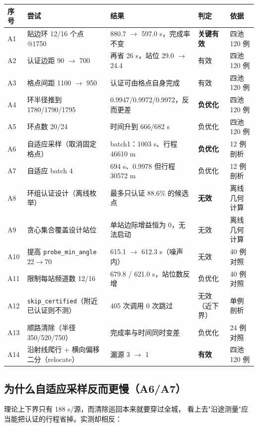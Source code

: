 \begin{center}
\footnotesize
\scriptsize
\begin{longtable}{p{0.5cm}p{3.2cm}p{3.0cm}p{2.1cm}p{2.9cm}}
\toprule
序号 & 尝试 & 结果 & 判定 & 依据 \\ \midrule
\endhead
A1 & 贴边环 12/16 个点 @1750 & 880.7 $\to$ 597.0 s，完成率不变 & \textbf{关键有效} & 四池 120 例 \\
A2 & 认证边距 90 $\to$ 700 & 再省 26 s，站位 29.0 $\to$ 24.4 & 有效 & 四池 120 例 \\
A3 & 格点间距 1100 $\to$ 950 & 认证可由格点自身完成 & 有效 & 四池 120 例 \\
A4 & 环半径推到 1780/1790/1795 & 0.9947/0.9972/0.9972，反而更差 & \textbf{负优化} & 四池 120 例 \\
A5 & 环点数 20/24 & 时间升到 666/682 s & 负优化 & 四池 120 例 \\
A6 & 自适应采样（取消固定格点） & batch1：1003 s、行程 46610 m & \textbf{负优化} & 12 例剖析 \\
A7 & 自适应 batch 4 & 694 s、0.9978 但行程 30572 m & 负优化 & 12 例剖析 \\
A8 & 环组认证设计（离线枚举） & 最多只认证 88.6\% 的候选点 & \textbf{无效} & 离线几何计算 \\
A9 & 贪心集合覆盖设计站位 & 单站边际增益恒为 0，无法启动 & 无效 & 离线几何计算 \\
A10 & 提高 \texttt{probe\_min\_angle} 22$\to$70 & 615.1 $\to$ 612.3 s（噪声内） & 无效 & 40 例对照 \\
A11 & 限制每站频道数 12/16 & 679.8 / 621.0 s，站位数反增 & 负优化 & 40 例对照 \\
A12 & \texttt{skip\_certified}（附近已认证则不测） & 405 次调用 0 次跳过 & 无效（近下界） & 单例剖析 \\
A13 & 顺路清除（半径 350/520/750） & 完成率与时间同时变差 & 负优化 & 24 例对照 \\
A14 & 沿射线爬行 + 横向偏移二分（relocate） & 漏源 3 $\to$ 1 & \textbf{有效} & 四池 120 例 \\
\bottomrule
\end{longtable}
\end{center}

\subsection{为什么自适应采样反而更慢（A6/A7）}

理论上下界只有 188 s/源，而清除巡回本来就要穿过全城，
看上去"沿途测量"应当能把认证的行程省掉。实测却相反：

